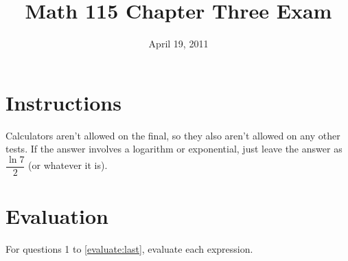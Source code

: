 \documentclass[fleqn,addpoints]{exam}
\title{Math 115 Chapter Three Exam}
\date{April 19, 2011}
\author{}
\begin{document}
\maketitle  

\ifprintanswers
\else
\vspace{0.2in}
\vspace{0.2in}

\begin{center}
\gradetable[h][pages]
\end{center}

\else

\section{Instructions}

Calculators aren't allowed on the final, so they also aren't allowed on any other tests.  If the answer involves a
logarithm or exponential, just leave the answer as $\dfrac{\ln 7}{2}$ (or whatever it is).

\fi

\section{Evaluation} 
 
For questions 1 to \ref{evaluate:last}, evaluate each expression.
 
\end{document}
